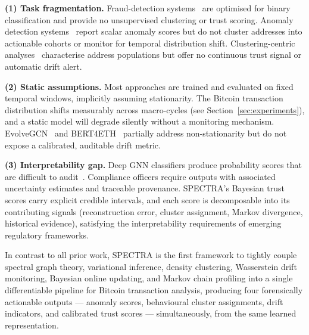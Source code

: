 \smallskip
\noindent\textbf{(1) Task fragmentation.}
Fraud-detection systems~\cite{Weber2019,Jha2023,Fan2024} are optimised for
binary classification and provide no unsupervised clustering or trust scoring.
Anomaly detection systems~\cite{Liu2024,AnCho2015} report scalar anomaly scores
but do not cluster addresses into actionable cohorts or monitor for temporal
distribution shift.  Clustering-centric analyses~\cite{Meiklejohn2013,Jourdan2019}
characterise address populations but offer no continuous trust signal or
automatic drift alert.

\smallskip
\noindent\textbf{(2) Static assumptions.}
Most approaches are trained and evaluated on fixed temporal windows, implicitly
assuming stationarity.  The Bitcoin transaction distribution shifts measurably
across macro-cycles (see Section~\ref{sec:experiments}), and a static model
will degrade silently without a monitoring mechanism.  EvolveGCN~\cite{Pareja2020}
and BERT4ETH~\cite{He2023} partially address non-stationarity but do not expose
a calibrated, auditable drift metric.

\smallskip
\noindent\textbf{(3) Interpretability gap.}
Deep GNN classifiers produce probability scores that are difficult to
audit~\cite{Chalapathy2019}.  Compliance officers require outputs with
associated uncertainty estimates and traceable provenance.  SPECTRA's
Bayesian trust scores carry explicit credible intervals, and each score is
decomposable into its contributing signals (reconstruction error, cluster
assignment, Markov divergence, historical evidence), satisfying the
interpretability requirements of emerging regulatory frameworks.

\smallskip
In contrast to all prior work, SPECTRA is the first framework to tightly couple
spectral graph theory, variational inference, density clustering, Wasserstein
drift monitoring, Bayesian online updating, and Markov chain profiling into a
single differentiable pipeline for Bitcoin transaction analysis, producing four
forensically actionable outputs --- anomaly scores, behavioural cluster
assignments, drift indicators, and calibrated trust scores --- simultaneously,
from the same learned representation.

